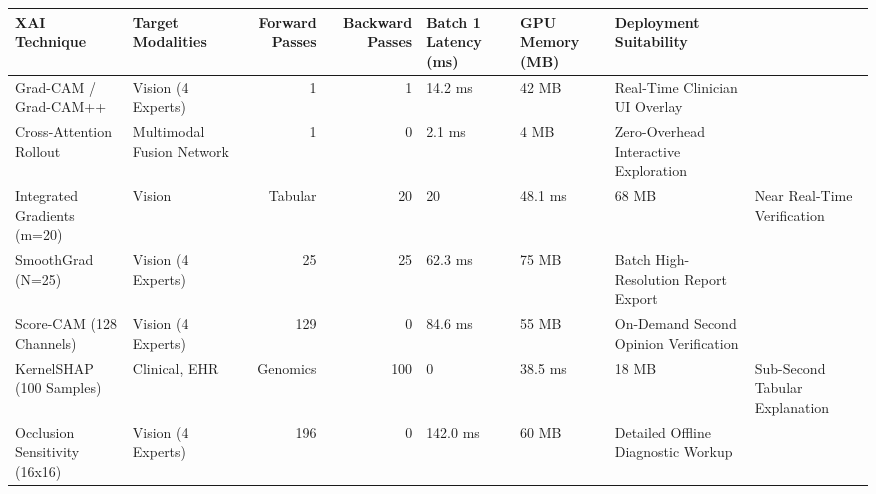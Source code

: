 \begin{tabular}{llrrlll}
\toprule
XAI Technique & Target Modalities & Forward Passes & Backward Passes & Batch 1 Latency (ms) & GPU Memory (MB) & Deployment Suitability \\
\midrule
Grad-CAM / Grad-CAM++ & Vision (4 Experts) & 1 & 1 & 14.2 ms & 42 MB & Real-Time Clinician UI Overlay \\
Cross-Attention Rollout & Multimodal Fusion Network & 1 & 0 & 2.1 ms & 4 MB & Zero-Overhead Interactive Exploration \\
Integrated Gradients (m=20) & Vision & Tabular & 20 & 20 & 48.1 ms & 68 MB & Near Real-Time Verification \\
SmoothGrad (N=25) & Vision (4 Experts) & 25 & 25 & 62.3 ms & 75 MB & Batch High-Resolution Report Export \\
Score-CAM (128 Channels) & Vision (4 Experts) & 129 & 0 & 84.6 ms & 55 MB & On-Demand Second Opinion Verification \\
KernelSHAP (100 Samples) & Clinical, EHR & Genomics & 100 & 0 & 38.5 ms & 18 MB & Sub-Second Tabular Explanation \\
Occlusion Sensitivity (16x16) & Vision (4 Experts) & 196 & 0 & 142.0 ms & 60 MB & Detailed Offline Diagnostic Workup \\
\bottomrule
\end{tabular}
